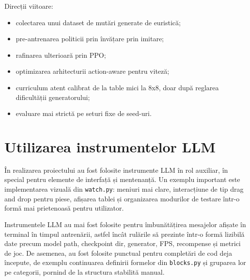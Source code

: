 \documentclass[12pt,a4paper]{article}
\begin{document}
Direcții viitoare:
\begin{itemize}
    \item colectarea unui dataset de mutări generate de euristică;
    \item pre-antrenarea politicii prin învățare prin imitare;
    \item rafinarea ulterioară prin PPO;
    \item optimizarea arhitecturii action-aware pentru viteză;
    \item curriculum atent calibrat de la table mici la 8x8, doar după reglarea dificultății generatorului;
    \item evaluare mai strictă pe seturi fixe de seed-uri.
\end{itemize}

\section{Utilizarea instrumentelor LLM}

În realizarea proiectului au fost folosite instrumente LLM în rol auxiliar, în special pentru elemente de interfață și mentenanță. Un exemplu important este implementarea vizuală din \texttt{watch.py}: meniuri mai clare, interacțiune de tip drag and drop pentru piese, afișarea tablei și organizarea modurilor de testare într-o formă mai prietenoasă pentru utilizator.

Instrumentele LLM au mai fost folosite pentru îmbunătățirea mesajelor afișate în terminal în timpul antrenării, astfel încât rulările să prezinte într-o formă lizibilă date precum model path, checkpoint dir, generator, FPS, recompense și metrici de joc. De asemenea, au fost folosite punctual pentru completări de cod deja începute, de exemplu continuarea definirii formelor din \texttt{blocks.py} și gruparea lor pe categorii, pornind de la structura stabilită manual.
\end{document}
